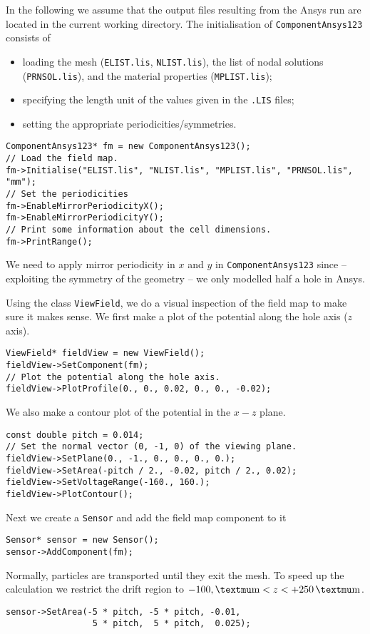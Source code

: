 In the following we assume that the output files resulting from the 
Ansys run are located in the current working directory.
The initialisation of \texttt{ComponentAnsys123} consists of 
\begin{itemize}
  \item
  loading the mesh (\texttt{ELIST.lis}, \texttt{NLIST.lis}), 
  the list of nodal solutions (\texttt{PRNSOL.lis}), and the 
  material properties (\texttt{MPLIST.lis});
  \item
  specifying the length unit of the values given in the 
  \texttt{.LIS} files;
  \item
  setting the appropriate periodicities/symmetries.
\end{itemize}
\begin{lstlisting}
ComponentAnsys123* fm = new ComponentAnsys123();
// Load the field map.
fm->Initialise("ELIST.lis", "NLIST.lis", "MPLIST.lis", "PRNSOL.lis", "mm");
// Set the periodicities
fm->EnableMirrorPeriodicityX();
fm->EnableMirrorPeriodicityY();
// Print some information about the cell dimensions.
fm->PrintRange();
\end{lstlisting}
We need to apply mirror periodicity in $x$ and $y$
in \texttt{ComponentAnsys123} since -- exploiting the symmetry   
of the geometry -- we only modelled half a hole in Ansys.

Using the class \texttt{ViewField}, we do a visual inspection of the 
field map to make sure it makes sense. 
We first make a plot of the potential along the hole axis ($z$ axis).
\begin{lstlisting}
ViewField* fieldView = new ViewField();
fieldView->SetComponent(fm);
// Plot the potential along the hole axis.
fieldView->PlotProfile(0., 0., 0.02, 0., 0., -0.02);
\end{lstlisting}
We also make a contour plot of the potential in the $x - z$ plane.
\begin{lstlisting}
const double pitch = 0.014;
// Set the normal vector (0, -1, 0) of the viewing plane.
fieldView->SetPlane(0., -1., 0., 0., 0., 0.);
fieldView->SetArea(-pitch / 2., -0.02, pitch / 2., 0.02);
fieldView->SetVoltageRange(-160., 160.);
fieldView->PlotContour();
\end{lstlisting}
Next we create a \texttt{Sensor} and add the field map 
component to it
\begin{lstlisting}
Sensor* sensor = new Sensor();
sensor->AddComponent(fm);
\end{lstlisting}
Normally, particles are transported until they exit the mesh. 
To speed up the calculation we restrict the drift region to 
$-100,\textmu\text{m} < z < +250\,\textmu\text{m}$.
\begin{lstlisting}
sensor->SetArea(-5 * pitch, -5 * pitch, -0.01,
                 5 * pitch,  5 * pitch,  0.025);
\end{lstlisting}
